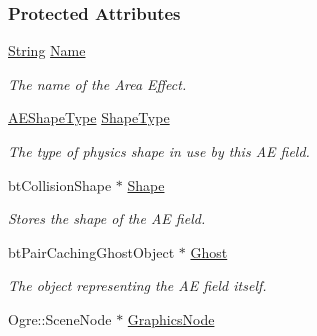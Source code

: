 \subsubsection*{Protected Attributes}
\begin{DoxyCompactItemize}
\item 
\hypertarget{classphys_1_1AreaEffect_a1cf5a878eb22b30a166f5b065944a986}{
\hyperlink{namespacephys_aa03900411993de7fbfec4789bc1d392e}{String} \hyperlink{classphys_1_1AreaEffect_a1cf5a878eb22b30a166f5b065944a986}{Name}}
\label{d4/d55/classphys_1_1AreaEffect_a1cf5a878eb22b30a166f5b065944a986}

\begin{DoxyCompactList}\small\item\em The name of the Area Effect. \item\end{DoxyCompactList}\item 
\hypertarget{classphys_1_1AreaEffect_a1465c564cc8e32b8a530881c5db70b88}{
\hyperlink{classphys_1_1AreaEffect_a99b8746c43eac266d48ad613110dc6f9}{AEShapeType} \hyperlink{classphys_1_1AreaEffect_a1465c564cc8e32b8a530881c5db70b88}{ShapeType}}
\label{d4/d55/classphys_1_1AreaEffect_a1465c564cc8e32b8a530881c5db70b88}

\begin{DoxyCompactList}\small\item\em The type of physics shape in use by this AE field. \item\end{DoxyCompactList}\item 
\hypertarget{classphys_1_1AreaEffect_af8189f9e8dc4bf04f44550918e0ee117}{
btCollisionShape $\ast$ \hyperlink{classphys_1_1AreaEffect_af8189f9e8dc4bf04f44550918e0ee117}{Shape}}
\label{d4/d55/classphys_1_1AreaEffect_af8189f9e8dc4bf04f44550918e0ee117}

\begin{DoxyCompactList}\small\item\em Stores the shape of the AE field. \item\end{DoxyCompactList}\item 
\hypertarget{classphys_1_1AreaEffect_ae730c591bf929404f337d71d4119bde8}{
btPairCachingGhostObject $\ast$ \hyperlink{classphys_1_1AreaEffect_ae730c591bf929404f337d71d4119bde8}{Ghost}}
\label{d4/d55/classphys_1_1AreaEffect_ae730c591bf929404f337d71d4119bde8}

\begin{DoxyCompactList}\small\item\em The object representing the AE field itself. \item\end{DoxyCompactList}\item 
\hypertarget{classphys_1_1AreaEffect_a7fbb785d7357cc7eac68dc94bb72c18a}{
Ogre::SceneNode $\ast$ \hyperlink{classphys_1_1AreaEffect_a7fbb785d7357cc7eac68dc94bb72c18a}{GraphicsNode}}
\label{d4/d55/classphys_1_1AreaEffect_a7fbb785d7357cc7eac68dc94bb72c18a}


\end{DoxyCompactItemize}
